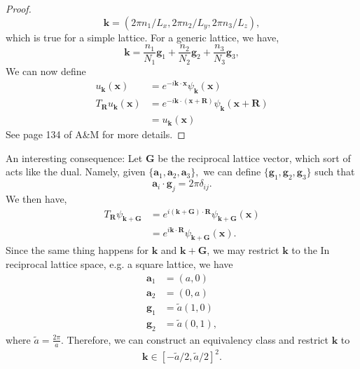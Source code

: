 \documentclass{article}
\numberwithin{equation}{section}
\begin{document}
\begin{proof}
\begin{equation}
        \bm{k} = (2\pi n_1/L_x, 2\pi n_2/L_y, 2\pi n_3/L_z),
    \end{equation}
    which is true for a simple lattice. For a generic lattice, we have,
    \begin{equation}
        \bm{k} = \frac{n_1}{N_1}\bm{g}_1 + \frac{n_2}{N_2}\bm{g}_2 + \frac{n_3}{N_3}\bm{g}_3,
    \end{equation}
    We can now define 
    \begin{align}
        u_{\bm{k}}(\bm{x}) &= e^{-i\bm{k}\cdot \bm{x}}\psi_{\bm{k}}(\bm{x}) \\
        T_{\bm{R}}u_{\bm{k}}(\bm{x}) &= e^{-i\bm{k}\cdot (\bm{x}+\bm{R})} \psi_{\bm{k}}(\bm{x}+\bm{R}) \\ 
        &= u_{\bm{k}}(\bm{x})
    \end{align}
    See page 134 of A\&M for more details.
\end{proof}
An interesting consequence: Let $\bm{G}$ be the reciprocal lattice vector, which sort of acts like the dual. Namely, given $\{\bm{a}_1,\bm{a}_2,\bm{a}_3\},$ we can define $\{\bm{g}_1,\bm{g}_2,\bm{g}_3\}$ such that 
\begin{equation}
    \bm{a}_i\cdot \bm{g}_j = 2\pi \delta_{ij}.
\end{equation}
We then have,
\begin{align}
    T_{\bm{R}}\psi_{\bm{k}+\bm{G}} &= e^{i(\bm{k}+\bm{G})\cdot \bm{R}}\psi_{\bm{k}+\bm{G}}(\bm{x}) \\ 
    &= e^{i\bm{k}\cdot \bm{R}}\psi_{\bm{k}+\bm{G}}(\bm{x}).
\end{align}
Since the same thing happens for $\bm{k}$ and $\bm{k}+\bm{G}$, we may restrict $\bm{k}$ to the  In reciprocal lattice space, e.g. a square lattice, we have 
\begin{align}
    \bm{a}_1 &= (a,0) \\ 
    \bm{a}_2 &= (0,a) \\ 
    \bm{g}_1 &= \tilde{a}(1,0) \\ 
    \bm{g}_2 &= \tilde{a}(0,1),
\end{align}
where $\tilde{a} = \frac{2\pi}{a}.$ Therefore, we can construct an equivalency class and restrict $\bm{k}$ to 
\begin{align}
   \bm{k} \in [-\tilde{a}/2,\tilde{a}/2]^2.
\end{align}
\end{document}
